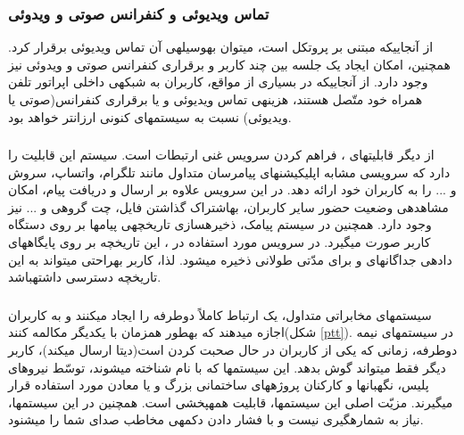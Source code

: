 \subsubsection{تماس ویدیوئی و کنفرانس صوتی و ویدوئی}

از آنجایی\nf که   مبتنی بر پروتکل  است، می\nf توان به\nf وسیله\nf ی آن تماس ویدیوئی برقرار کرد. همچنین، امکان ایجاد یک جلسه بین چند کاربر و برقراری کنفرانس صوتی و ویدوئی نیز وجود دارد. از آنجایی\nf که در بسیاری از مواقع، کاربران  به شبکه\nf ی داخلی اپراتور تلفن همراه خود متّصل هستند، هزینه\nf ی تماس ویدیوئی و یا برقراری کنفرانس(صوتی یا ویدیوئی) نسبت به سیستم\nf های کنونی ارزان\nf تر خواهد بود\cite{blended}. 


\subsubsection{}

از دیگر قابلیت\nf های ، فراهم کردن سرویس غنی ارتبطات است. سیستم  این قابلیت را دارد که سرویسی مشابه اپلیکیشن\nf های پیام\nf رسان متداول مانند تلگرام، واتساپ، سروش و ... را به کاربران خود ارائه دهد. در این سرویس علاوه بر ارسال و دریافت پیام، امکان مشاهده\nf ی وضعیت حضور سایر کاربران، به\nf اشتراک گذاشتن فایل، چت گروهی و ... نیز وجود دارد. همچنین در سیستم پیامک، ذخیره\nf سازی تاریخچه\nf ی پیام\nf ها بر روی دستگاه کاربر صورت می\nf گیرد. در سرویس  مورد استفاده در ، این تاریخچه بر روی پایگاه\nf های داده\nf ی جداگانه\nf ای و برای مدّتی طولانی ذخیره می\nf شود. لذا، کاربر به\nf راحتی می\nf تواند به این تاریخچه دسترسی داشته\nf باشد\cite{3gims}.


\subsubsection{}

سیستم\nf های مخابراتی متداول، یک ارتباط کاملاً دوطرفه را ایجاد می\nf کنند و به کاربران اجازه می\nf دهند که به\nf طور هم\nf زمان با یکدیگر مکالمه کنند(شکل \ref{ptt}). در سیستم\nf های نیمه دوطرفه، زمانی که یکی از کاربران در حال صحبت کردن است(دیتا ارسال می\nf کند)، کاربر دیگر فقط می\nf تواند گوش بدهد. این سیستم\nf ها که با نام  شناخته می\nf شوند، توسّط نیروهای پلیس، نگهبان\nf ها و کارکنان پروژه\nf های ساختمانی بزرگ و یا معادن مورد استفاده قرار می\nf گیرند. مزیّت اصلی این سیستم\nf ها، قابلیت همه\nf پخشی است. همچنین در این سیستم\nf ها، نیاز به شماره\nf گیری نیست و با فشار دادن دکمه\nf ی  مخاطب صدای شما را می\nf شنود.

